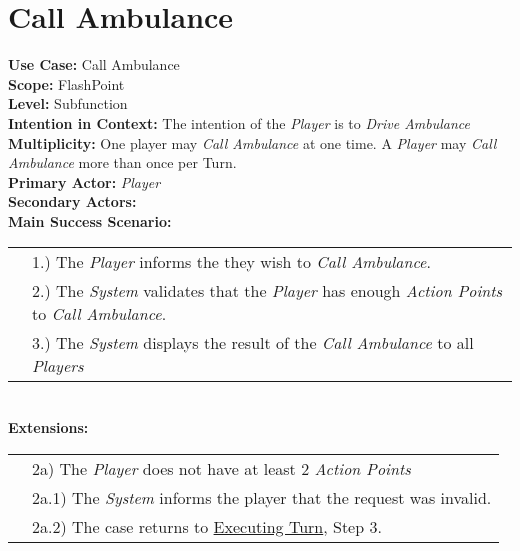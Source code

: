 \documentclass{article}
\begin{document}
	\section*{Call Ambulance}
	\textbf{Use Case:} Call Ambulance\\
	\textbf{Scope:} FlashPoint\\
	\textbf{Level:} Subfunction\\
	\textbf{Intention in Context:} The intention of the \textit{Player} is to \textit{Drive Ambulance}\\
	\textbf{Multiplicity: } One player may \textit{Call Ambulance} at one time. A \textit{Player} may \textit{Call Ambulance} more than once per Turn.\\
	\textbf{Primary Actor:} \textit{Player}\\
	\textbf{Secondary Actors:}\\
	\textbf{Main Success Scenario:}\\
	\begin{tabular}{l l}
		&1.) The \textit{Player} informs the \text{System} they wish to \textit{Call Ambulance}.\\
		&2.) The \textit{System} validates that the \textit{Player} has enough \textit{Action Points} to \textit{Call Ambulance}. \\
		&3.) The \textit{System} displays the result of the \textit{Call Ambulance} to all \textit{Players}
	\end{tabular}\\
	\textbf{Extensions: } \\
	\begin{tabular}{l l}
		&2a) The \textit{Player} does not have at least 2 \textit{Action Points} \\
		&\qquad2a.1) The \textit{System} informs the player that the request was invalid. \\
		&\qquad2a.2) The case returns to \underline{Executing Turn}, Step 3.\\
	\end{tabular}
	
\end{document}
